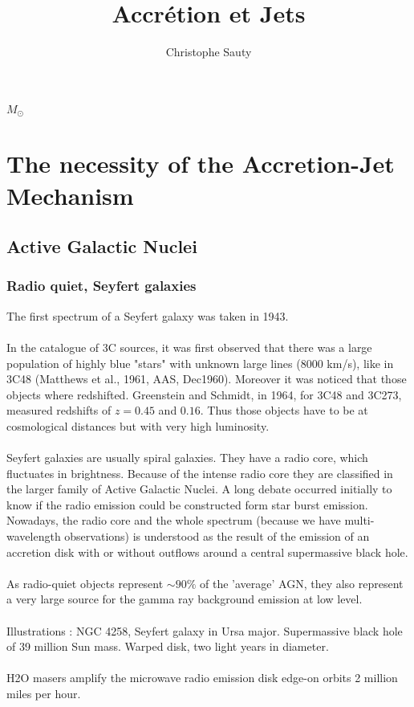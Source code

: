 \documentclass[10pt,a4paper]{article}
\author{Christophe Sauty}
\title{Accrétion et Jets}
\begin{document}
\maketitle

\tableofcontents
\newpage

$M_{\odot}$ %

\section{The necessity of the Accretion-Jet Mechanism}
\subsection{Active Galactic Nuclei}
\subsubsection{Radio quiet, Seyfert galaxies}
The first spectrum of a Seyfert galaxy was taken in 1943.\\
\\
In the catalogue of 3C sources, it was first observed that there was a large population of highly blue "stars" with unknown large lines (8000 km/s), like in 3C48 (Matthews et al., 1961, AAS, Dec1960). Moreover it was noticed that those objects where redshifted. Greenstein and Schmidt, in 1964, for 3C48 and 3C273, measured redshifts of $z=0.45$ and $0.16$. Thus those objects have to be at cosmological distances but with very high luminosity.\\
\\
Seyfert galaxies are usually spiral galaxies. They have a radio core, which fluctuates in brightness. Because of the intense radio core they are classified in the larger family of Active Galactic Nuclei. A long debate occurred initially to know if the radio emission could be constructed form star burst emission. Nowadays, the radio core and the whole spectrum (because we have multi-wavelength observations) is understood as the result of the emission of an accretion disk with or without outflows around a central supermassive black hole.\\
\\
As radio-quiet objects represent $\sim 90 \% $ of the 'average' AGN, they also represent a very large source for the gamma ray background emission at low level.\\
\\
Illustrations : NGC 4258, Seyfert galaxy in Ursa major. Supermassive black hole of 39 million Sun mass. Warped disk, two light years in diameter.\\
\\
H2O masers amplify the microwave radio emission disk edge-on orbits 2 million miles per hour.
\end{document}
